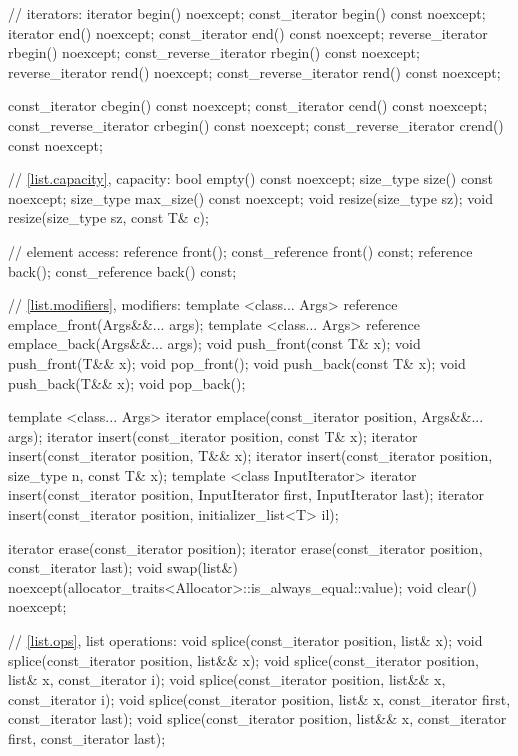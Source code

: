\begin{codeblock}
{{    // iterators:
    iterator               begin() noexcept;
    const_iterator         begin() const noexcept;
    iterator               end() noexcept;
    const_iterator         end() const noexcept;
    reverse_iterator       rbegin() noexcept;
    const_reverse_iterator rbegin() const noexcept;
    reverse_iterator       rend() noexcept;
    const_reverse_iterator rend() const noexcept;

    const_iterator         cbegin() const noexcept;
    const_iterator         cend() const noexcept;
    const_reverse_iterator crbegin() const noexcept;
    const_reverse_iterator crend() const noexcept;

    // \ref{list.capacity}, capacity:
    bool      empty() const noexcept;
    size_type size() const noexcept;
    size_type max_size() const noexcept;
    void      resize(size_type sz);
    void      resize(size_type sz, const T& c);

    // element access:
    reference       front();
    const_reference front() const;
    reference       back();
    const_reference back() const;

    // \ref{list.modifiers}, modifiers:
    template <class... Args> reference emplace_front(Args&&... args);
    template <class... Args> reference emplace_back(Args&&... args);
    void push_front(const T& x);
    void push_front(T&& x);
    void pop_front();
    void push_back(const T& x);
    void push_back(T&& x);
    void pop_back();

    template <class... Args> iterator emplace(const_iterator position, Args&&... args);
    iterator insert(const_iterator position, const T& x);
    iterator insert(const_iterator position, T&& x);
    iterator insert(const_iterator position, size_type n, const T& x);
    template <class InputIterator>
      iterator insert(const_iterator position, InputIterator first,
                      InputIterator last);
    iterator insert(const_iterator position, initializer_list<T> il);

    iterator erase(const_iterator position);
    iterator erase(const_iterator position, const_iterator last);
    void     swap(list&)
      noexcept(allocator_traits<Allocator>::is_always_equal::value);
    void     clear() noexcept;

    // \ref{list.ops}, list operations:
    void splice(const_iterator position, list& x);
    void splice(const_iterator position, list&& x);
    void splice(const_iterator position, list& x, const_iterator i);
    void splice(const_iterator position, list&& x, const_iterator i);
    void splice(const_iterator position, list& x,
                const_iterator first, const_iterator last);
    void splice(const_iterator position, list&& x,
                const_iterator first, const_iterator last);

}}
\end{codeblock}
